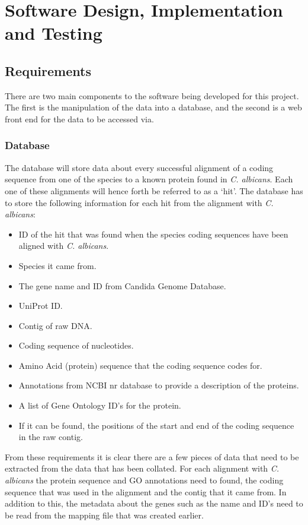 \chapter{Software Design, Implementation and Testing}

\section{Requirements}
There are two main components to the software being developed for this project. The first is the manipulation of the data into a database, and the second is a web front end for the data to be accessed via. 

\subsection{Database}
The database will store data about every successful alignment of a coding sequence from one of the species to a known protein found in \textit{C. albicans}. Each one of these alignments will hence forth be referred to as a `hit'. The database has to store the following information for each hit from the alignment with \textit{C. albicans}:

\begin{itemize}
  \item ID of the hit that was found when the species coding sequences have been aligned with \textit{C. albicans}.
  \item Species it came from.
  \item The gene name and ID from Candida Genome Database.
  \item UniProt ID.
  \item Contig of raw DNA.
  \item Coding sequence of nucleotides.
  \item Amino Acid (protein) sequence that the coding sequence codes for.
  \item Annotations from NCBI nr database to provide a description of the proteins.
  \item A list of Gene Ontology\cite{geneontology} ID's for the protein.
  \item If it can be found, the positions of the start and end of the coding sequence in the raw contig. 
\end{itemize}

From these requirements it is clear there are a few pieces of data that need to be extracted from the data that has been collated. For each alignment with \textit{C. albicans} the protein sequence and GO annotations need to found, the coding sequence that was used in the alignment and the contig that it came from. In addition to this, the metadata about the genes such as the name and ID's need to be read from the mapping file that was created earlier. 

